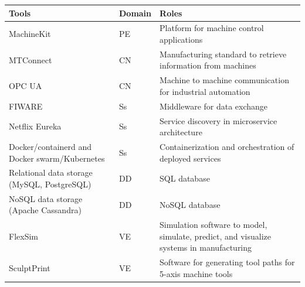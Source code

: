 \documentclass[article,table]{aaltoseries}
\begin{document}
\begin{table}[]
	\begin{tabular}{|p{3.8cm}|p{1.5cm}|p{5.8cm}|}
		\hline
		\rowcolor[HTML]{C0C0C0} 
		Tools                                                        & Domain & Roles                                                                                   \\ \hline
		MachineKit                                                   & PE             & Platform for machine control applications                                               \\ \hline
		MTConnect                                                    & CN             & Manufacturing standard to retrieve information from machines                            \\ \hline
		OPC UA                                                       & CN             & Machine to machine communication for industrial automation                              \\ \hline
		FIWARE                                                       & Ss             & Middleware for data exchange                                                            \\ \hline
		Netflix Eureka                                               & Ss             & Service discovery in microservice architecture                                          \\ \hline
		Docker/containerd and Docker swarm/Kubernetes                & Ss             & Containerization and orchestration of deployed services                                 \\ \hline
		Relational data storage (MySQL, PostgreSQL)                  & DD             & SQL database                                                                            \\ \hline
		NoSQL data storage (Apache Cassandra)                        & DD             & NoSQL database                                                                          \\ \hline
		FlexSim                                                      & VE             & Simulation software to model, simulate, predict, and visualize systems in manufacturing \\ \hline
		SculptPrint                                                  & VE             & Software for generating tool paths for 5-axis machine tools                             \\ \hline

\end{tabular}
\end{table}
\end{document}
